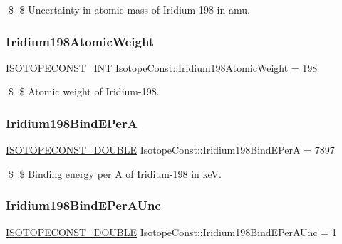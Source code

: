 \$ \$ Uncertainty in atomic mass of Iridium-\/198 in amu. \mbox{\label{group___isotope_const-_iridium-_ir198_ga373e75383837aac170f3d403e54de957}} 
\subsubsection{\texorpdfstring{Iridium198\+Atomic\+Weight}{Iridium198AtomicWeight}}
{\footnotesize\ttfamily \mbox{\hyperlink{group___isotope_const-_macros_ga5f18360b3e99483a35c32d789e62621c}{I\+S\+O\+T\+O\+P\+E\+C\+O\+N\+S\+T\+\_\+\+I\+NT}} Isotope\+Const\+::\+Iridium198\+Atomic\+Weight = 198}

\$ \$ Atomic weight of Iridium-\/198. \mbox{\label{group___isotope_const-_iridium-_ir198_ga23d9a207f902bde8174a05e7c5793a1b}} 
\subsubsection{\texorpdfstring{Iridium198\+Bind\+E\+PerA}{Iridium198BindEPerA}}
{\footnotesize\ttfamily \mbox{\hyperlink{group___isotope_const-_macros_ga8f45a7272ce02c0b4c65c44636ed719a}{I\+S\+O\+T\+O\+P\+E\+C\+O\+N\+S\+T\+\_\+\+D\+O\+U\+B\+LE}} Isotope\+Const\+::\+Iridium198\+Bind\+E\+PerA = 7897}

\$ \$ Binding energy per A of Iridium-\/198 in keV. \mbox{\label{group___isotope_const-_iridium-_ir198_ga1df6bc642cccfe83f2af124d84e08e9a}} 
\subsubsection{\texorpdfstring{Iridium198\+Bind\+E\+Per\+A\+Unc}{Iridium198BindEPerAUnc}}
{\footnotesize\ttfamily \mbox{\hyperlink{group___isotope_const-_macros_ga8f45a7272ce02c0b4c65c44636ed719a}{I\+S\+O\+T\+O\+P\+E\+C\+O\+N\+S\+T\+\_\+\+D\+O\+U\+B\+LE}} Isotope\+Const\+::\+Iridium198\+Bind\+E\+Per\+A\+Unc = 1}

